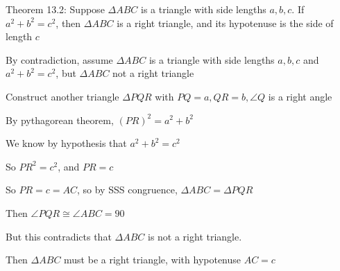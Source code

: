 \documentclass[11pt]{article}
\begin{document}
\begin{itemize}
		Theorem 13.2: Suppose $\Delta ABC$ is a triangle with side lengths $a,b,c$. If $a^2 + b^2 = c^2$, then $\Delta ABC$ is a right triangle, and its hypotenuse is the side of length $c$

		By contradiction, assume $\Delta ABC$ is a triangle with side lengths $a,b,c$ and $a^2 + b^2 = c^2$, but $\Delta ABC$ not a right triangle

		Construct another triangle $\Delta PQR$ with $PQ = a, QR = b, \angle Q$ is a right angle

		By pythagorean theorem, $(PR)^2 = a^2 + b^2$

		We know by hypothesis that $a^2 + b^2 = c^2$

		So $PR^2 = c^2$, and $PR = c$

		So $PR = c = AC$, so by SSS congruence, $\Delta ABC = \Delta PQR$

		Then $\angle PQR \cong \angle ABC = 90$

		But this contradicts that $\Delta ABC$ is not a right triangle.

		Then $\Delta ABC$ must be a right triangle, with hypotenuse $AC = c$

\end{itemize}
\end{document}
